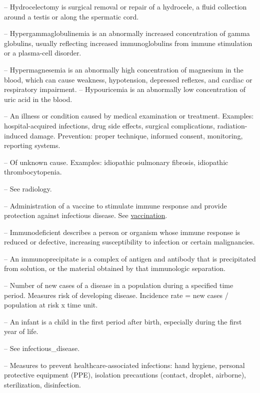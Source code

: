 -- Hydrocelectomy is surgical removal or repair of a hydrocele, a fluid collection around a testis or along the spermatic cord.

-- Hypergammaglobulinemia is an abnormally increased concentration of gamma globulins, usually reflecting increased immunoglobulins from immune stimulation or a plasma-cell disorder.

-- Hypermagnesemia is an abnormally high concentration of magnesium in the blood, which can cause weakness, hypotension, depressed reflexes, and cardiac or respiratory impairment.
-- Hypouricemia is an abnormally low concentration of uric acid in the blood.

-- An illness or condition caused by medical examination or treatment. Examples: hospital-acquired infections, drug side effects, surgical complications, radiation-induced damage. Prevention: proper technique, informed consent, monitoring, reporting systems.

-- Of unknown cause. Examples: idiopathic pulmonary fibrosis, idiopathic thrombocytopenia.

-- See radiology.

-- Administration of a vaccine to stimulate immune response and provide protection against infectious disease. See \hyperlink{Vaccination}{vaccination}.

-- Immunodeficient describes a person or organism whose immune response is reduced or defective, increasing susceptibility to infection or certain malignancies.

-- An immunoprecipitate is a complex of antigen and antibody that is precipitated from solution, or the material obtained by that immunologic separation.

-- Number of new cases of a disease in a population during a specified time period. Measures risk of developing disease. Incidence rate = new cases / population at risk x time unit.

-- An infant is a child in the first period after birth, especially during the first year of life.

-- See infectious\_disease.

-- Measures to prevent healthcare-associated infections: hand hygiene, personal protective equipment (PPE), isolation precautions (contact, droplet, airborne), sterilization, disinfection.

